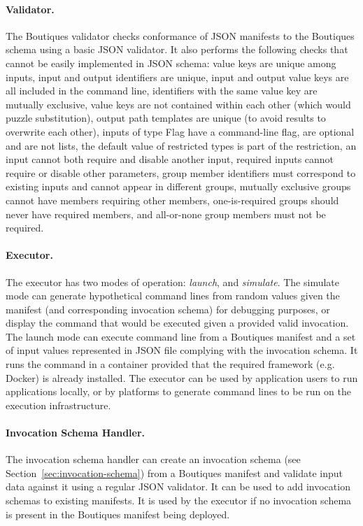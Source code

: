 \documentclass{article}
\newcommand{\boutiques}{Boutiques\xspace}
\begin{document}
\paragraph{Validator.} The \boutiques validator checks conformance of JSON
manifests to the \boutiques schema using a basic JSON validator. It also
performs the following checks that cannot be easily implemented in JSON schema:
value keys are unique among inputs, input and output identifiers are
unique, input and output value keys are all included in the command
line, identifiers with the same value key are mutually exclusive, value keys
are not contained within each other (which would puzzle substitution), output
path templates are unique (to avoid results to overwrite each other), inputs of
type Flag have a command-line flag, are optional and are not lists, the default
value of restricted types is part of the restriction, an input cannot both require
and disable another input, required inputs cannot require or disable
other parameters, group member identifiers must correspond to existing
inputs and cannot appear in different groups, mutually exclusive
groups cannot have members requiring other members, one-is-required groups
should never have required members, and all-or-none group members must not be
required.


\paragraph{Executor.} The executor has two modes of operation: \emph{launch}, and
\emph{simulate}. The simulate mode can generate hypothetical command lines from
random values given the manifest (and corresponding invocation schema) for debugging
purposes, or display the command that would be executed given a provided valid
invocation. The launch mode can execute command line from a \boutiques manifest and
a set of input values represented in JSON file complying with the invocation schema.
It runs the command in a container provided that the required framework (e.g. Docker)
is already installed. The executor can be used by application users to run
applications locally, or by platforms to generate command lines to be run on the
execution infrastructure.

\paragraph{Invocation Schema Handler.} The invocation schema handler can create an
invocation schema (see Section~\ref{sec:invocation-schema}) from a \boutiques manifest
and validate input data against it using a regular JSON validator. It can be used to add
invocation schemas to existing manifests. It is used by the executor if no invocation
schema is present in the \boutiques manifest being deployed.
\end{document}
